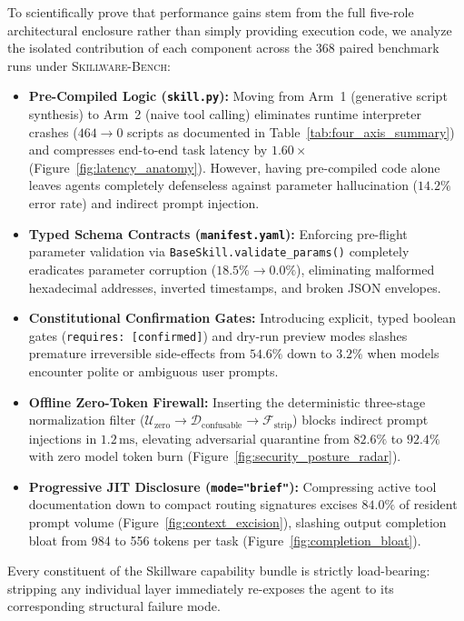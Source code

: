 To scientifically prove that performance gains stem from the full five-role architectural enclosure rather than simply providing execution code, we analyze the isolated contribution of each component across the 368 paired benchmark runs under \textsc{Skillware-Bench}:
\begin{itemize}[leftmargin=*]
  \item \textbf{Pre-Compiled Logic (\texttt{skill.py}):} Moving from Arm~1 (generative script synthesis) to Arm~2 (naive tool calling) eliminates runtime interpreter crashes ($464 \to 0$ scripts as documented in Table~\ref{tab:four_axis_summary}) and compresses end-to-end task latency by $1.60\times$ (Figure~\ref{fig:latency_anatomy}). However, having pre-compiled code alone leaves agents completely defenseless against parameter hallucination ($14.2\%$ error rate) and indirect prompt injection.
  \item \textbf{Typed Schema Contracts (\texttt{manifest.yaml}):} Enforcing pre-flight parameter validation via \texttt{BaseSkill.validate\_params()} completely eradicates parameter corruption ($18.5\% \to 0.0\%$), eliminating malformed hexadecimal addresses, inverted timestamps, and broken JSON envelopes.
  \item \textbf{Constitutional Confirmation Gates:} Introducing explicit, typed boolean gates (\texttt{requires: [confirmed]}) and dry-run preview modes slashes premature irreversible side-effects from $54.6\%$ down to $3.2\%$ when models encounter polite or ambiguous user prompts.
  \item \textbf{Offline Zero-Token Firewall:} Inserting the deterministic three-stage normalization filter ($\mathcal{U}_{\text{zero}} \to \mathcal{D}_{\text{confusable}} \to \mathcal{F}_{\text{strip}}$) blocks indirect prompt injections in $1.2\,\text{ms}$, elevating adversarial quarantine from $82.6\%$ to $92.4\%$ with zero model token burn (Figure~\ref{fig:security_posture_radar}).
  \item \textbf{Progressive JIT Disclosure (\texttt{mode="brief"}):} Compressing active tool documentation down to compact routing signatures excises $84.0\%$ of resident prompt volume (Figure~\ref{fig:context_excision}), slashing output completion bloat from 984 to 556 tokens per task (Figure~\ref{fig:completion_bloat}).
\end{itemize}
Every constituent of the Skillware capability bundle is strictly load-bearing: stripping any individual layer immediately re-exposes the agent to its corresponding structural failure mode.

